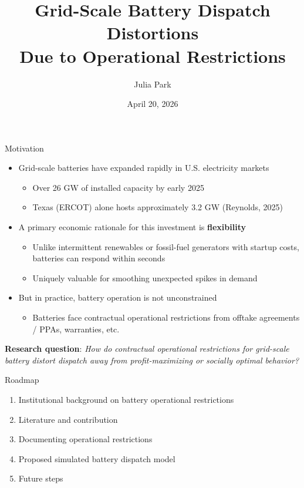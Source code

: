 \documentclass{beamer}
\title{Grid-Scale Battery Dispatch Distortions \\ Due to Operational Restrictions}
\author{Julia Park}
\date{April 20, 2026}
\begin{document}
\frame{\titlepage}

\begin{frame}{Motivation}
\begin{itemize}
    \item Grid-scale batteries have expanded rapidly in U.S. electricity markets
    \begin{itemize}
        \item Over 26 GW of installed capacity by early 2025
        \item Texas (ERCOT) alone hosts approximately 3.2 GW (Reynolds, 2025)
    \end{itemize}
    \pause
    \item A primary economic rationale for this investment is \textbf{flexibility}
    \begin{itemize}
        \item Unlike intermittent renewables or fossil-fuel generators with startup costs, batteries can respond within seconds
        \item Uniquely valuable for smoothing unexpected spikes in demand
    \end{itemize}
    \pause
    \item But in practice, battery operation is not unconstrained
    \begin{itemize}
        \item Batteries face contractual operational restrictions from offtake agreements / PPAs, warranties, etc.
    \end{itemize}
\end{itemize}

\textbf{Research question}: \textit{How do contractual operational restrictions for grid-scale battery distort dispatch away from profit-maximizing or socially optimal behavior?}
\end{frame}


\begin{frame}{Roadmap}
    \begin{enumerate}
        \item Institutional background on battery operational restrictions
        \item Literature and contribution
        \item Documenting operational restrictions
        \item Proposed simulated battery dispatch model 
        \item Future steps
    \end{enumerate}
\end{frame}
\end{document}
